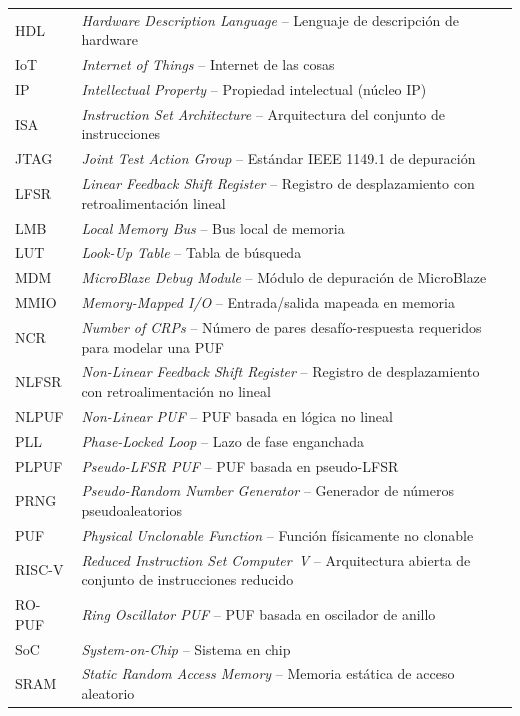 \begin{longtable}{@{}p{2.2cm}@{}p{\dimexpr\textwidth-2.2cm\relax}@{}}
HDL    & \textit{Hardware Description Language} -- Lenguaje de descripción de hardware \\[4pt]
IoT    & \textit{Internet of Things} -- Internet de las cosas \\[4pt]
IP     & \textit{Intellectual Property} -- Propiedad intelectual (núcleo IP) \\[4pt]
ISA    & \textit{Instruction Set Architecture} -- Arquitectura del conjunto de instrucciones \\[4pt]
JTAG   & \textit{Joint Test Action Group} -- Estándar IEEE 1149.1 de depuración \\[4pt]
LFSR   & \textit{Linear Feedback Shift Register} -- Registro de desplazamiento con retroalimentación lineal \\[4pt]
LMB    & \textit{Local Memory Bus} -- Bus local de memoria \\[4pt]
LUT    & \textit{Look-Up Table} -- Tabla de búsqueda \\[4pt]
MDM    & \textit{MicroBlaze Debug Module} -- Módulo de depuración de MicroBlaze \\[4pt]
MMIO   & \textit{Memory-Mapped I/O} -- Entrada/salida mapeada en memoria \\[4pt]
NCR    & \textit{Number of CRPs} -- Número de pares desafío-respuesta requeridos para modelar una PUF \\[4pt]
NLFSR  & \textit{Non-Linear Feedback Shift Register} -- Registro de desplazamiento con retroalimentación no lineal \\[4pt]
NLPUF  & \textit{Non-Linear PUF} -- PUF basada en lógica no lineal \\[4pt]
PLL    & \textit{Phase-Locked Loop} -- Lazo de fase enganchada \\[4pt]
PLPUF  & \textit{Pseudo-LFSR PUF} -- PUF basada en pseudo-LFSR \\[4pt]
PRNG   & \textit{Pseudo-Random Number Generator} -- Generador de números pseudoaleatorios \\[4pt]
PUF    & \textit{Physical Unclonable Function} -- Función físicamente no clonable \\[4pt]
RISC-V & \textit{Reduced Instruction Set Computer~V} -- Arquitectura abierta de conjunto de instrucciones reducido \\[4pt]
RO-PUF & \textit{Ring Oscillator PUF} -- PUF basada en oscilador de anillo \\[4pt]
SoC    & \textit{System-on-Chip} -- Sistema en chip \\[4pt]
SRAM   & \textit{Static Random Access Memory} -- Memoria estática de acceso aleatorio \\[4pt]

\end{longtable}
